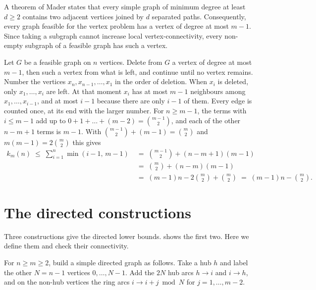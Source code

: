 \begin{remark}\label{rem:vertex-degeneracy}
A theorem of Mader \cite{Mader71,Mader73b} states that every simple graph of minimum degree at least $d \ge 2$ contains two adjacent vertices joined by $d$ separated paths.
Consequently, every graph feasible for the vertex problem has a vertex of degree at most $m-1$.
Since taking a subgraph cannot increase local vertex-connectivity, every non-empty subgraph of a feasible graph has such a vertex.

Let $G$ be a feasible graph on $n$ vertices. Delete from $G$ a vertex of degree at most $m-1$, then such a vertex from what is left, and continue until no vertex remains. Number the vertices $x_n,x_{n-1},\dots,x_1$ in the order of deletion. When $x_i$ is deleted, only $x_1,\dots,x_i$ are left. At that moment $x_i$ has at most $m-1$ neighbours among $x_1,\dots,x_{i-1}$, and at most $i-1$ because there are only $i-1$ of them. Every edge is counted once, at its end with the larger number.
For $n\ge m-1$, the terms with $i\le m-1$ add up to $0+1+\dots+(m-2)=\binom{m-1}{2}$, and each of the other $n-m+1$ terms is $m-1$.
With $\binom{m-1}{2}+(m-1)=\binom{m}{2}$ and $m(m-1)=2\binom{m}{2}$ this gives
\[
\begin{aligned}
    k_m(n) \;\le\; \sum_{i=1}^{n}\min(i-1,\,m-1) &\;=\; \binom{m-1}{2} + (n-m+1)(m-1) \\
    &\;=\; \binom{m}{2} + (n-m)(m-1) \\
    &\;=\; (m-1)n - 2\binom{m}{2} + \binom{m}{2} \;=\; (m-1)n - \binom{m}{2}.
\end{aligned}
\]
\end{remark}


\section{The directed constructions}\label{sec:dir-constructions}

Three constructions give the directed lower bounds.
 shows the first two.
Here we define them and check their connectivity.

\begin{construction}\label{const:directed-hub}
For $n \ge m \ge 2$, build a simple directed graph as follows. Take a hub $h$ and label the other $N = n-1$ vertices $0, \dots, N-1$. Add the $2N$ hub arcs $h \to i$ and $i \to h$, and on the non-hub vertices the ring arcs $i \to i+j \bmod N$ for $j = 1, \dots, m-2$.
\end{construction}

